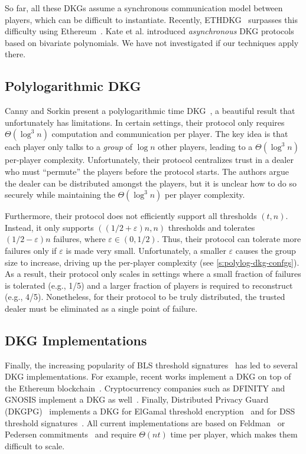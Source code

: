 So far, all these DKGs assume a synchronous communication model between players, which can be difficult to instantiate.
Recently, ETHDKG~\cite{SJSW19} surpasses this difficulty using Ethereum~\cite{ethereum}.
Kate et al. introduced \textit{asynchronous} DKG protocols~\cite{Kate2010,KG09} based on bivariate polynomials.
We have not investigated if our techniques apply there.


\subsection{Polylogarithmic DKG}
\label{s:related-work:polylogdkg}
Canny and Sorkin present a polylogarithmic time DKG~\cite{CS04}, a beautiful result that unfortunately has limitations.
In certain settings, their protocol only requires $\Theta(\log^3{n})$ computation and communication per player.
The key idea is that each player only talks to a \textit{group} of $\log{n}$ other players, leading to a $\Theta(\log^3{n})$ per-player complexity.
Unfortunately, their protocol centralizes trust in a dealer who must ``permute'' the players before the protocol starts.
The authors argue the dealer can be distributed amongst the players, but it is unclear how to do so securely while maintaining the $\Theta(\log^3{n})$ per player complexity.

Furthermore, their protocol does not efficiently support all thresholds $(t,n)$.
Instead, it only supports $((1/2 + \varepsilon)n, n)$ thresholds and tolerates $(1/2 - \varepsilon)n$ failures, where $\varepsilon \in (0,1/2)$.
Thus, their protocol can tolerate more failures only if $\varepsilon$ is made very small.
Unfortunately, a smaller $\varepsilon$ causes the group size to increase, driving up the per-player complexity (see \cref{s:polylog-dkg-confgs}).
As a result, their protocol only scales in settings where a small fraction of failures is tolerated (e.g., 1/5) and a larger fraction of players is required to reconstruct (e.g., 4/5).
Nonetheless, for their protocol to be truly distributed, the trusted dealer must be eliminated as a single point of failure.

\subsection{DKG Implementations}
\label{s:related-work:dkg-impl}
Finally, the increasing popularity of BLS threshold signatures~\cite{Boldyreva03} has led to several DKG implementations.
For example, recent works implement a DKG on top of the Ethereum blockchain~\cite{SJSW19,Schindler2018EthDkgGithub,orbs-dkg-github}.
Cryptocurrency companies such as DFINITY and GNOSIS implement a DKG as well~\cite{dfinity-dkg,gnosis-dkg}.
Finally, Distributed Privacy Guard (DKGPG)~\cite{dkgpg} implements a DKG for ElGamal threshold encryption~\cite{DF90} and for DSS threshold signatures~\cite{CGJ+99}.
All current implementations are based on Feldman~\cite{Feldman87} or Pedersen commitments~\cite{Pedersen1991AThreshold} and require $\Theta(nt)$ time per player, which makes them difficult to scale.